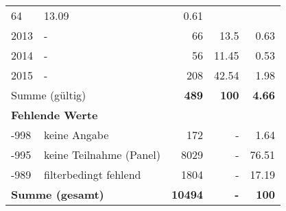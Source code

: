 \begin{longtable}{lXrrr}
       \num{64} &
       \num[round-mode=places,round-precision=2]{13,09} &
         \num[round-mode=places,round-precision=2]{0,61} \\

     2013 &
     \multicolumn{1}{X}{ -  } &


       \num{66} &
       \num[round-mode=places,round-precision=2]{13,5} &
         \num[round-mode=places,round-precision=2]{0,63} \\

     2014 &
     \multicolumn{1}{X}{ -  } &


       \num{56} &
       \num[round-mode=places,round-precision=2]{11,45} &
         \num[round-mode=places,round-precision=2]{0,53} \\

     2015 &
     \multicolumn{1}{X}{ -  } &


       \num{208} &
       \num[round-mode=places,round-precision=2]{42,54} &
         \num[round-mode=places,round-precision=2]{1,98} \\
     \midrule
     \multicolumn{2}{l}{Summe (gültig)} &
       \textbf{\num{489}} &
     \textbf{100} &
       \textbf{\num[round-mode=places,round-precision=2]{4,66}} \\
     \multicolumn{5}{l}{\textbf{Fehlende Werte}}\\
       -998 &
       keine Angabe &
         \num{172} &
        - &
         \num[round-mode=places,round-precision=2]{1,64} \\
       -995 &
       keine Teilnahme (Panel) &
         \num{8029} &
        - &
         \num[round-mode=places,round-precision=2]{76,51} \\
       -989 &
       filterbedingt fehlend &
         \num{1804} &
        - &
         \num[round-mode=places,round-precision=2]{17,19} \\
     \midrule
     \multicolumn{2}{l}{\textbf{Summe (gesamt)}} &
          \textbf{\num{10494}} &
        \textbf{-} &
        \textbf{100} \\
     \bottomrule
     \end{longtable}
     
